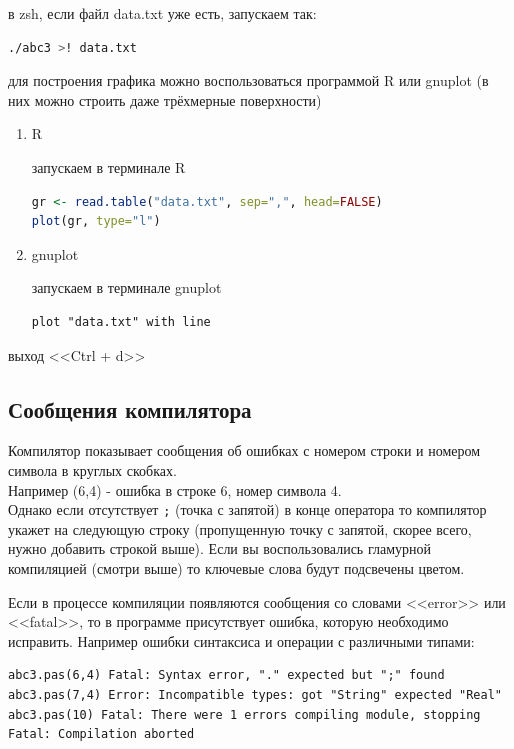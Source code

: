 \documentclass[unicode, 12pt, a4paper,oneside,fleqn]{article}
\begin{document}
\begin{enumerate}
в zsh, если файл data.txt уже есть, запускаем так:
\begin{lstlisting}[language=bash]
./abc3 >! data.txt
\end{lstlisting}


  
для построения графика можно воспользоваться программой R или gnuplot
(в них можно строить даже трёхмерные поверхности)

  \begin{enumerate}
  \item R
    
    запускаем в терминале R
{\begin{lstlisting}[language=R,basicstyle=\small]
gr <- read.table("data.txt", sep=",", head=FALSE)
plot(gr, type="l")
\end{lstlisting}}

  \item gnuplot
    
    запускаем в терминале gnuplot
\begin{lstlisting}[language=gnuplot]
plot "data.txt" with line
\end{lstlisting}
  \end{enumerate}
\end{enumerate}

выход <<Ctrl + d>>




\subsection{Сообщения компилятора}

Компилятор показывает сообщения об ошибках с номером строки и номером
символа в круглых скобках.\\
Например (6,4) - ошибка в строке 6, номер символа 4.\\
Однако если отсутствует \verb!;! (точка с запятой) в конце оператора
то компилятор укажет на следующую строку (пропущенную точку с запятой,
скорее всего, нужно добавить строкой выше). Если вы воспользовались
гламурной компиляцией (смотри выше) то ключевые слова будут подсвечены
цветом.
 
Если в процессе компиляции появляются сообщения со словами <<error>>
или <<fatal>>, то в программе присутствует ошибка, которую необходимо
исправить. Например ошибки синтаксиса и операции с различными типами:
{\tiny
\begin{verbatim}
abc3.pas(6,4) Fatal: Syntax error, "." expected but ";" found
abc3.pas(7,4) Error: Incompatible types: got "String" expected "Real"
abc3.pas(10) Fatal: There were 1 errors compiling module, stopping
Fatal: Compilation aborted
\end{verbatim}
}
\end{document}
